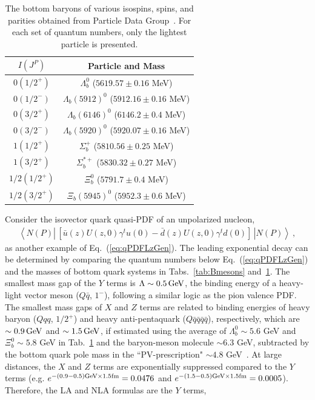\documentclass[a4paper,11pt]{article}
\begin{document}
\begin{table}[]
    \centering
    \begin{tabular}{|c|c|}
    \hline
    $I(J^{P})$    & Particle and Mass\\
    \hline
    $0(1/2^{+})$  & $\Lambda^0_b$ ($5619.57\pm0.16$ MeV) \\
    $0(1/2^{-})$  & $\Lambda_b(5912)^{0}$ ($5912.16\pm 0.16$ MeV) \\
    $0(3/2^{+})$  & $\Lambda_b(6146)^{0}$ ($6146.2\pm 0.4$ MeV) \\
    $0(3/2^{-})$  & $\Lambda_b(5920)^{0}$ ($5920.07\pm 0.16$ MeV) \\
    $1(1/2^{+})$  & $\Sigma_b^{+}$ ($5810.56\pm 0.25$ MeV) \\
    $1(3/2^{+})$  & $\Sigma_b^{*+}$ ($5830.32\pm 0.27$ MeV) \\
    $1/2(1/2^{+})$  & $\Xi_b^{0}$ ($5791.7 \pm 0.4$ MeV) \\
    $1/2(3/2^{+})$  & $\Xi_b(5945)^0$ ($5952.3 \pm 0.6$ MeV) \\
    \hline
    \end{tabular}
    \caption{The bottom baryons of various isospins, spins, and parities obtained from Particle Data Group~\cite{ParticleDataGroup:2024cfk}. For each set of quantum numbers, only the lightest particle is presented. }
    \label{tab:Bbaryons}
\end{table}
Consider the isovector quark quasi-PDF of an unpolarized nucleon,
\begin{align}
\left\langle N(P) \left| \, \left[ \bar{u}(z) U(z,0) \gamma^t u(0) - \bar{d}(z) U(z,0) \gamma^t d(0) \right] \, \right| N(P) \right\rangle \ ,
\end{align}
as another example of Eq.~(\ref{eq:qPDFLzGen}). The leading exponential decay can be determined by comparing the quantum numbers below Eq.~(\ref{eq:qPDFLzGen}) and the masses of bottom quark systems in Tabs.~\ref{tab:Bmesons} and~\ref{tab:Bbaryons}. The smallest mass gap of the $Y$ terms is $\Lambda\sim 0.5 \, {\rm GeV}$, the binding energy of a heavy-light vector meson ($Q \bar{q}$, $1^{-}$), following a similar logic as the pion valence PDF. The smallest mass gaps of $X$ and $Z$ terms are related to binding energies of heavy baryon ($Q qq$, $1/2^{+}$) and heavy anti-pentaquark ($Q \bar{q} \bar{q}\bar{q}\bar{q}$), respectively, which are $\sim 0.9 \, {\rm GeV}$ and $\sim 1.5 \, {\rm GeV}$, if estimated using the average of $\Lambda^0_b\sim 5.6$ GeV and $\Xi^0_b\sim 5.8$ GeV in Tab.~\ref{tab:Bbaryons} and the baryon-meson molecule $\sim 6.3$ GeV, subtracted by the bottom quark pole mass in the ``PV-prescription" $\sim4.8$ GeV~\cite{Ayala:2019hkn}. At large distances, the $X$ and $Z$ terms are exponentially suppressed compared to the $Y$ terms (e.g. $e^{-(0.9-0.5) {\rm GeV}\times 1.5 {\rm fm}}=0.0476$ and $e^{-(1.5-0.5) {\rm GeV}\times 1.5 {\rm fm}}=0.0005$). Therefore, the LA and NLA formulas are the $Y$ terms,
\end{document}
